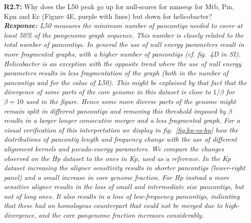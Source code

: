\documentclass[aps,rmp,onecolumn]{revtex4-1}
\newcommand{\Marco}[1]{{\color{gray}Marco: #1}}
\newcommand{\Liam}[1]{{\color{teal}Liam: #1}}
\newcommand{\reviewer}[2]{\textbf{#1:} #2\vskip 5mm}
\newcommand{\response}[1]{{\it {\color{response}\textbf{Response:} #1}}\vskip 5mm}
\begin{document}
\reviewer{R2.7}{Why does the L50 peak go up for null-scores for mmseqs for Mtb, Pm, Kpn and Ec (Figure 4E, purple with lines) but down for helicobacter?}
\response{L50 measures the minimum number of pancontigs needed to cover at least 50\% of the pangenome graph sequence. This number is closely related to the total number of pancontigs. In general the use of null energy parameters result in more fragmented graphs, with a higher number of pancontigs (cf. fig.~4D in SI). Helicobacter is an exception with the opposite trend where the use of null energy parameters results in less fragmentation of the graph (both in the number of pancontigs and for the value of L50).
      This might be explained by that fact that the divergence of some parts of the core genome in this dataset is close to $1/\beta$ for $
            \beta=10$ used in the figure.
      Hence some more diverse parts of the genome might remain split in different pancontigs and removing this threshold imposed by $\beta$ results in a larger longer consecutive merger and a less fragmented graph.
      For a visual verification of this interpretation we display in fig.~\ref{fig:kp-vs-hp} how the distributions of pancontig length and frequency change with the use of different alignment kernels and pseudo-energy parameters. We compare the changes observed on the Hp dataset to the ones in Kp, used as a reference. In the Kp dataset increasing the aligner sensitivity results in shorter pancontigs (lower-right panel) and a small increase in core genome fraction. For Hp instead a more sensitive aligner results in the loss of small and intermediate size pancontigs, but not of long ones. It also results in a loss of low-frequency pancontigs, indicating that these had an homologous counterpart that could not be merged due to high-divergence, and the core pangenome fraction increases considerably.
}
\end{document}
